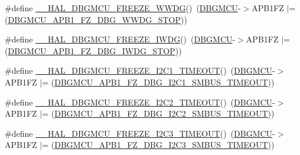 \begin{DoxyCompactItemize}
\item 
\#define \hyperlink{group___h_a_l___exported___macros_ga81215154725c479c67fb1adac906fbd9}{\+\_\+\+\_\+\+H\+A\+L\+\_\+\+D\+B\+G\+M\+C\+U\+\_\+\+F\+R\+E\+E\+Z\+E\+\_\+\+W\+W\+DG}()~(\hyperlink{group___peripheral__declaration_ga92ec6d9ec2251fda7d4ce09748cd74b4}{D\+B\+G\+M\+CU}-\/$>$A\+P\+B1\+FZ $\vert$= (\hyperlink{group___peripheral___registers___bits___definition_ga8a49d5e849185d09ee6c7594512ffe88}{D\+B\+G\+M\+C\+U\+\_\+\+A\+P\+B1\+\_\+\+F\+Z\+\_\+\+D\+B\+G\+\_\+\+W\+W\+D\+G\+\_\+\+S\+T\+OP}))
\item 
\#define \hyperlink{group___h_a_l___exported___macros_gabab7ab631ba58fb6246a9385e8af9d0d}{\+\_\+\+\_\+\+H\+A\+L\+\_\+\+D\+B\+G\+M\+C\+U\+\_\+\+F\+R\+E\+E\+Z\+E\+\_\+\+I\+W\+DG}()~(\hyperlink{group___peripheral__declaration_ga92ec6d9ec2251fda7d4ce09748cd74b4}{D\+B\+G\+M\+CU}-\/$>$A\+P\+B1\+FZ $\vert$= (\hyperlink{group___peripheral___registers___bits___definition_gada8989cb96dd5d6dbdaaf16e1f127c6a}{D\+B\+G\+M\+C\+U\+\_\+\+A\+P\+B1\+\_\+\+F\+Z\+\_\+\+D\+B\+G\+\_\+\+I\+W\+D\+G\+\_\+\+S\+T\+OP}))
\item 
\#define \hyperlink{group___h_a_l___exported___macros_ga6160f642dcff812be3a04c5b5c66e31d}{\+\_\+\+\_\+\+H\+A\+L\+\_\+\+D\+B\+G\+M\+C\+U\+\_\+\+F\+R\+E\+E\+Z\+E\+\_\+\+I2\+C1\+\_\+\+T\+I\+M\+E\+O\+UT}()~(\hyperlink{group___peripheral__declaration_ga92ec6d9ec2251fda7d4ce09748cd74b4}{D\+B\+G\+M\+CU}-\/$>$A\+P\+B1\+FZ $\vert$= (\hyperlink{group___peripheral___registers___bits___definition_gae83fb5d62c6e6fa1c2fd06084528404e}{D\+B\+G\+M\+C\+U\+\_\+\+A\+P\+B1\+\_\+\+F\+Z\+\_\+\+D\+B\+G\+\_\+\+I2\+C1\+\_\+\+S\+M\+B\+U\+S\+\_\+\+T\+I\+M\+E\+O\+UT}))
\item 
\#define \hyperlink{group___h_a_l___exported___macros_gacc31f8475c2e3e30ee99e53814faa523}{\+\_\+\+\_\+\+H\+A\+L\+\_\+\+D\+B\+G\+M\+C\+U\+\_\+\+F\+R\+E\+E\+Z\+E\+\_\+\+I2\+C2\+\_\+\+T\+I\+M\+E\+O\+UT}()~(\hyperlink{group___peripheral__declaration_ga92ec6d9ec2251fda7d4ce09748cd74b4}{D\+B\+G\+M\+CU}-\/$>$A\+P\+B1\+FZ $\vert$= (\hyperlink{group___peripheral___registers___bits___definition_ga8f6320aba695f6c3f97608e478533e96}{D\+B\+G\+M\+C\+U\+\_\+\+A\+P\+B1\+\_\+\+F\+Z\+\_\+\+D\+B\+G\+\_\+\+I2\+C2\+\_\+\+S\+M\+B\+U\+S\+\_\+\+T\+I\+M\+E\+O\+UT}))
\item 
\#define \hyperlink{group___h_a_l___exported___macros_gacd3fd0373b45de1b86be07bd4007c30e}{\+\_\+\+\_\+\+H\+A\+L\+\_\+\+D\+B\+G\+M\+C\+U\+\_\+\+F\+R\+E\+E\+Z\+E\+\_\+\+I2\+C3\+\_\+\+T\+I\+M\+E\+O\+UT}()~(\hyperlink{group___peripheral__declaration_ga92ec6d9ec2251fda7d4ce09748cd74b4}{D\+B\+G\+M\+CU}-\/$>$A\+P\+B1\+FZ $\vert$= (\hyperlink{group___peripheral___registers___bits___definition_ga7f7e5c708387aa1ddae35b892811b4e9}{D\+B\+G\+M\+C\+U\+\_\+\+A\+P\+B1\+\_\+\+F\+Z\+\_\+\+D\+B\+G\+\_\+\+I2\+C3\+\_\+\+S\+M\+B\+U\+S\+\_\+\+T\+I\+M\+E\+O\+UT}))

\end{DoxyCompactItemize}
